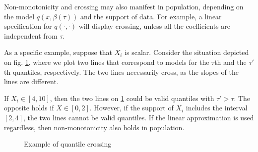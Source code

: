    Non-monotonicity and crossing may also manifest in population, depending on the model $q(x, \beta(\tau))$ and the support of data.  
   For example, a linear specification for $q(\cdot, \cdot)$ will display crossing, unless all the coefficients are independent from $\tau$.
   
   As a specific example, suppose that $X_i$ is scalar. Consider the situation depicted on fig. \ref{quantile:figure:quantile_crossing}, where we plot two lines that correspond to models for the $\tau$th and the $\tau'$th quantiles, respectively.
   The two lines necessarily cross, as  the slopes of the lines are different.
   
   If $X_i\in [4, 10]$, then the two lines on  \ref{quantile:figure:quantile_crossing} could be valid quantiles with $\tau'>\tau$. The opposite holds if $X\in [0, 2]$.  However, if the support of $X_i$ includes the interval $[2, 4]$, the two lines cannot be valid quantiles. If the linear approximation is used regardless, then non-monotonicity also holds in population. 
   
 
 \begin{figure}[ht!]
 	\centering
 	 \caption{Example of quantile crossing}\label{quantile:figure:quantile_crossing}
 	 \end{figure}
 	  
